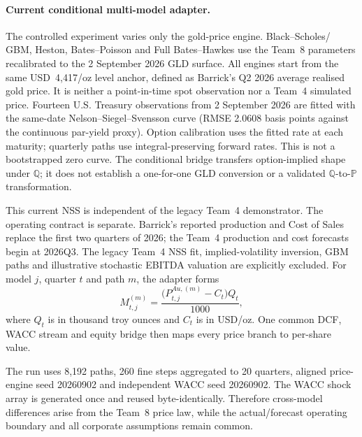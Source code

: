 \paragraph{Current conditional multi-model adapter.}

The controlled experiment varies only the gold-price engine. Black--Scholes/
GBM, Heston, Bates--Poisson and Full Bates--Hawkes use the Team~8 parameters
recalibrated to the 2 September 2026 GLD surface. All engines start from the same
USD~4,417/oz level anchor, defined as Barrick's Q2 2026 average realised gold
price. It is neither a point-in-time spot observation nor a Team~4 simulated
price. Fourteen U.S. Treasury observations from 2 September 2026 are fitted
with the same-date Nelson--Siegel--Svensson curve (RMSE 2.0608 basis points
against the continuous par-yield proxy). Option calibration uses the fitted
rate at each maturity; quarterly paths use integral-preserving forward rates.
This is not a bootstrapped zero curve. The conditional bridge transfers option-implied shape under
$\mathbb Q$; it does not establish a one-for-one GLD conversion or a validated
$\mathbb Q$-to-$\mathbb P$ transformation.

This current NSS is independent of the legacy Team~4 demonstrator. The
operating contract is separate. Barrick's reported production and Cost of
Sales replace the first two quarters of 2026; the Team~4 production and cost
forecasts begin at 2026Q3. The legacy Team~4 NSS fit, implied-volatility inversion,
GBM paths and illustrative stochastic EBITDA valuation are explicitly
excluded. For model $j$, quarter $t$ and path $m$, the adapter forms
\begin{equation}
M_{t,j}^{(m)}=\frac{\bigl(P_{t,j}^{Au,(m)}-C_t\bigr)Q_t}{1000},
\end{equation}
where $Q_t$ is in thousand troy ounces and $C_t$ is in USD/oz. One common DCF,
WACC stream and equity bridge then maps every price branch to per-share value.

The run uses 8,192 paths, 260 fine steps aggregated to 20 quarters, aligned
price-engine seed 20260902 and independent WACC seed 20260902. The WACC shock
array is generated once and reused byte-identically. Therefore cross-model
differences arise from the Team~8 price law, while the actual/forecast
operating boundary and all corporate assumptions remain common.
